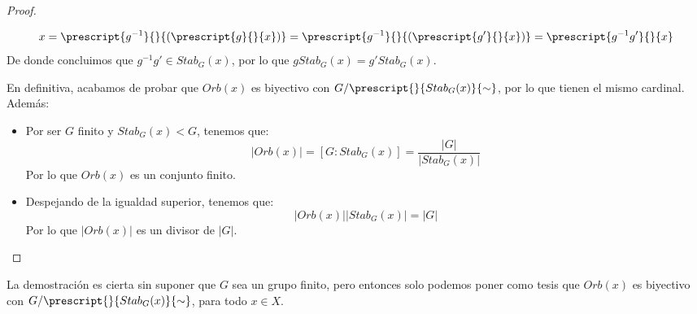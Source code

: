 \begin{prop}
\begin{proof}
\begin{itemize}
               \begin{equation*}
                   x = \prescript{g^{-1}}{}{(\prescript{g}{}{x})} = \prescript{g^{-1}}{}{(\prescript{g'}{}{x})} = \prescript{g^{-1}g'}{}{x}
               \end{equation*}
               De donde concluimos que $g^{-1}g'\in Stab_G(x)$, por lo que $gStab_G(x) = g'Stab_G(x)$.
       \end{itemize}
       En definitiva, acabamos de probar que $Orb(x)$ es biyectivo con $G/\prescript{}{Stab_G(x)}{\sim}$, por lo que tienen el mismo cardinal. Además:
       \begin{itemize}
           \item Por ser $G$ finito y $Stab_G(x)<G$, tenemos que:
               \begin{equation*}
                   |Orb(x)| = [G:Stab_G(x)] = \dfrac{|G|}{|Stab_G(x)|}
               \end{equation*}
               Por lo que $Orb(x)$ es un conjunto finito.
           \item Despejando de la igualdad superior, tenemos que:
               \begin{equation*}
                   |Orb(x)||Stab_G(x)| = |G|
               \end{equation*}
               Por lo que $|Orb(x)|$ es un divisor de $|G|$.
       \end{itemize}
   \end{proof}
\end{prop}

\begin{observacion}
La demostración es cierta sin suponer que $G$ sea un grupo finito, pero entonces solo podemos poner como tesis que $Orb(x)$ es biyectivo con $G/\prescript{}{Stab_G(x)}{\sim}$, para todo $x\in X$.
\end{observacion}

